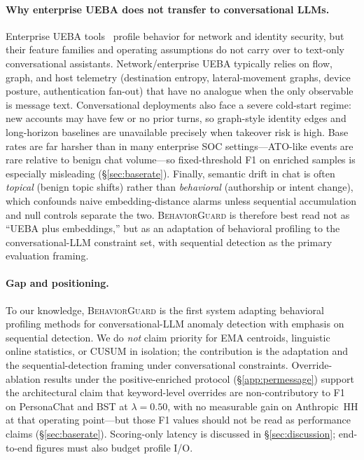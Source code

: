 \documentclass[conference]{IEEEtran}
\newcommand{\BG}{\textsc{BehaviorGuard}}
\begin{document}
\paragraph{Why enterprise UEBA does not transfer to conversational LLMs.}
\label{sec:related:ueba}
Enterprise UEBA tools~\cite{darktrace2023ato,infosign2025ato} profile behavior for
network and identity security, but their feature families and operating assumptions
do not carry over to text-only conversational assistants.
Network/enterprise UEBA typically relies on flow, graph, and host telemetry
(destination entropy, lateral-movement graphs, device posture, authentication
fan-out) that have no analogue when the only observable is message text.
Conversational deployments also face a severe cold-start regime: new accounts may
have few or no prior turns, so graph-style identity edges and long-horizon baselines
are unavailable precisely when takeover risk is high.
Base rates are far harsher than in many enterprise SOC settings---ATO-like events
are rare relative to benign chat volume---so fixed-threshold F1 on enriched samples
is especially misleading (\S\ref{sec:baserate}).
Finally, semantic drift in chat is often \emph{topical} (benign topic shifts) rather
than \emph{behavioral} (authorship or intent change), which confounds naive
embedding-distance alarms unless sequential accumulation and null controls separate
the two.
\BG{} is therefore best read not as ``UEBA plus embeddings,'' but as an adaptation
of behavioral profiling to the conversational-LLM constraint set, with sequential
detection as the primary evaluation framing.

\paragraph{Gap and positioning.}
To our knowledge, \BG{} is the first system adapting behavioral profiling methods
for conversational-LLM anomaly detection with emphasis on sequential detection.
We do \emph{not} claim priority for EMA centroids, linguistic online statistics, or
CUSUM in isolation; the contribution is the adaptation and the sequential-detection
framing under conversational constraints.
Override-ablation results under the positive-enriched protocol
(\S\ref{app:permessage}) support the architectural claim that keyword-level
overrides are non-contributory to F1 on PersonaChat and BST at $\lambda{=}0.50$,
with no measurable gain on Anthropic~HH at that operating point---but those F1
values should not be read as performance claims (\S\ref{sec:baserate}).
Scoring-only latency is discussed in \S\ref{sec:discussion}; end-to-end figures must
also budget profile I/O.
\end{document}
